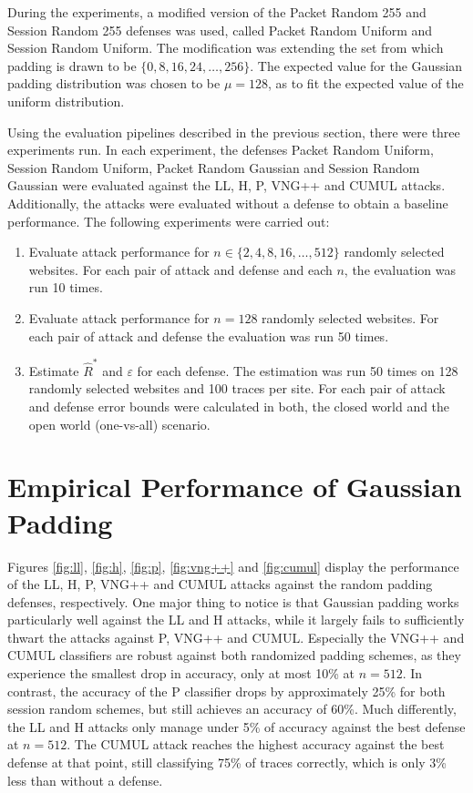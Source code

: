 \documentclass[
	ruledheaders=chapter,
	class=report,
	thesis={type=master, department=inf},
	accentcolor=1c,
	custommargins=true,
	marginpar=false,
	parskip=half-,
	fontsize=11pt,
]{tudapub}
\begin{document}
	During the experiments, a modified version of the Packet Random 255 and Session Random 255 defenses was used, called Packet Random Uniform and Session Random Uniform. The modification was extending the set from which padding is drawn to be $\{0, 8, 16, 24, \ldots, 256\}$. The expected value for the Gaussian padding distribution was chosen to be $\mu = 128$, as to fit the expected value of the uniform distribution.
	
	Using the evaluation pipelines described in the previous section, there were three experiments run. In each experiment, the defenses Packet Random Uniform, Session Random Uniform, Packet Random Gaussian and Session Random Gaussian were evaluated against the LL, H, P, VNG++ and CUMUL attacks. Additionally, the attacks were evaluated without a defense to obtain a baseline performance. The following experiments were carried out:
	
	\begin{enumerate}
		\item Evaluate attack performance for $n \in \{2, 4, 8, 16, \ldots, 512\}$ randomly selected websites. For each pair of attack and defense and each $n$, the evaluation was run 10 times.
		\item Evaluate attack performance for $n = 128$ randomly selected websites. For each pair of attack and defense the evaluation was run 50 times.
		\item Estimate $\widehat{R}^*$ and $\varepsilon$ for each defense. The estimation was run 50 times on 128 randomly selected websites and 100 traces per site. For each pair of attack and defense error bounds were calculated in both, the closed world and the open world (one-vs-all) scenario.
	\end{enumerate}

	\section{Empirical Performance of Gaussian Padding}
	\label{performance}
	
	Figures \ref{fig:ll}, \ref{fig:h}, \ref{fig:p}, \ref{fig:vng++} and \ref{fig:cumul} display the performance of the LL, H, P, VNG++ and CUMUL attacks against the random padding defenses, respectively. One major thing to notice is that Gaussian padding works particularly well against the LL and H attacks, while it largely fails to sufficiently thwart the attacks against P, VNG++ and CUMUL. Especially the VNG++ and CUMUL classifiers are robust against both randomized padding schemes, as they experience the smallest drop in accuracy, only at most 10\% at $n = 512$. In contrast, the accuracy of the P classifier drops by approximately 25\% for both session random schemes, but still achieves an accuracy of 60\%. Much differently, the LL and H attacks only manage under 5\% of accuracy against the best defense at $n = 512$. The CUMUL attack reaches the highest accuracy against the best defense at that point, still classifying 75\% of traces correctly, which is only 3\% less than without a defense.
	
\end{document}
